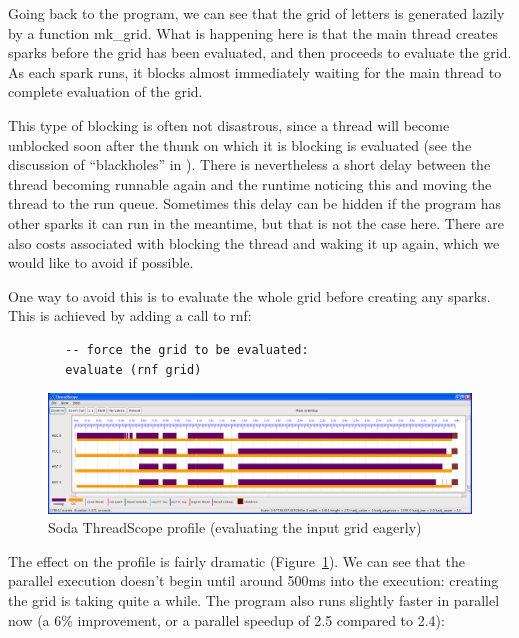\documentclass[twocolumn,9pt]{sigplanconf}
\newcommand{\codef}[1]{{\fontfamily{cmss}\small#1}}
\begin{document}
Going back to the program, we can see that the grid of letters is
generated lazily by a function \codef{mk\_grid}.  What is happening here is
that the main thread creates sparks before the grid has been
evaluated, and then proceeds to evaluate the grid.  As each spark
runs, it blocks almost immediately waiting for the main thread to
complete evaluation of the grid.

This type of blocking is often not disastrous, since a thread will become
unblocked soon after the thunk on which it is blocking is evaluated
(see the discussion of ``blackholes'' in \citet{multicore-ghc}).  There
is nevertheless a short delay between the thread becoming runnable
again and the runtime noticing this and moving the thread to the run
queue.  Sometimes this delay can be hidden if the program has other
sparks it can run in the meantime, but that is not the case
here.  There are also costs associated with blocking the thread and waking
it up again, which we would like to avoid if possible.

One way to avoid this is to evaluate the whole grid before creating
any sparks.  This is achieved by adding a call to \codef{rnf}:

\begin{lstlisting}
        -- force the grid to be evaluated:
        evaluate (rnf grid)
\end{lstlisting}

\begin{figure}
\begin{center}
\includegraphics[scale=0.3]{soda3.png}
\end{center}
\caption{Soda ThreadScope profile (evaluating the input grid eagerly)}
\label{f:soda-threadscope3}
\end{figure}

The effect on the profile is fairly dramatic
(Figure~\ref{f:soda-threadscope3}).  We can see that the parallel
execution doesn't begin until around 500ms into the execution:
creating the grid is taking quite a while.  The program also runs
slightly faster in parallel now (a 6\% improvement, or a parallel
speedup of 2.5 compared to 2.4):
\end{document}
